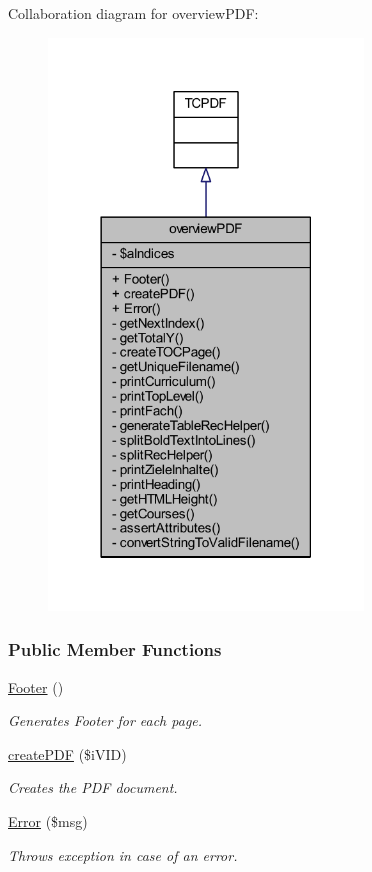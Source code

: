Collaboration diagram for overview\+P\+D\+F\+:
\nopagebreak
\begin{figure}[H]
\begin{center}
\leavevmode
\includegraphics[width=237pt]{classoverview_p_d_f__coll__graph}
\end{center}
\end{figure}
\subsubsection*{Public Member Functions}
\begin{DoxyCompactItemize}
\item 
\hyperlink{classoverview_p_d_f_a2f39533ba0786237090683635ef01c49}{Footer} ()
\begin{DoxyCompactList}\small\item\em Generates Footer for each page. \end{DoxyCompactList}\item 
\hyperlink{classoverview_p_d_f_a30ddd92aaf87bca0825c149bd3a7d43f}{create\+P\+D\+F} (\$i\+V\+I\+D)
\begin{DoxyCompactList}\small\item\em Creates the P\+D\+F document. \end{DoxyCompactList}\item 
\hyperlink{classoverview_p_d_f_a5afab85a7aaf19395f9a0e86cae76928}{Error} (\$msg)
\begin{DoxyCompactList}\small\item\em Throws exception in case of an error. \end{DoxyCompactList}\end{DoxyCompactItemize}
